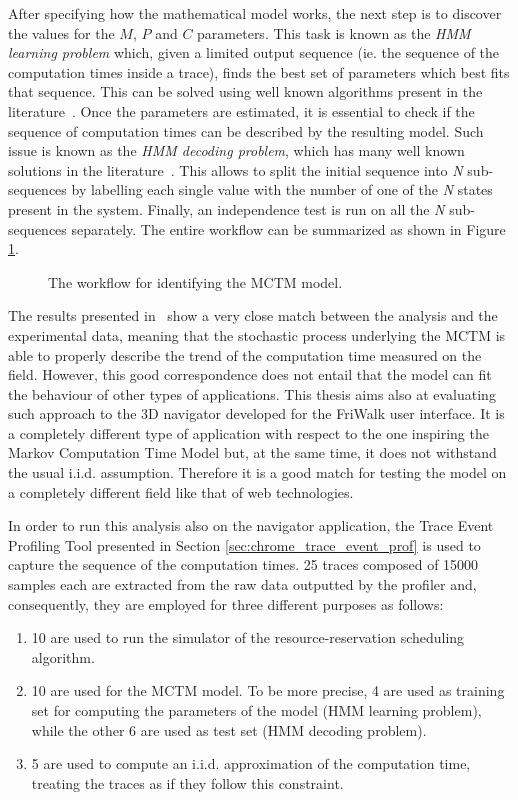 After specifying how the mathematical model works, the next step is to discover
the values for the \(M\), \(P\) and \(C\) parameters. This task is known as the
\emph{HMM learning problem} which, given a limited output sequence (ie. the
sequence of the computation times inside a trace),
finds the best set of parameters which best fits that sequence.
This can be solved using well known algorithms present in the
literature~\cite{baum1972inequality}.
Once the parameters are estimated, it is essential to check if the sequence of
computation times can be described by the resulting model.
Such issue is known as the \emph{HMM decoding problem}, which has many well
known solutions in the literature~\cite{forney1973viterbi}. This allows to split
the initial sequence into \emph{N} sub-sequences by labelling each single value
with the number of one of the \emph{N} states present in the system.
Finally, an independence test is run on all the \emph{N} sub-sequences separately.
The entire workflow can be summarized as shown in Figure \ref{img:hmm_workflow}.
\begin{figure}[!htb]
    \caption{The workflow for identifying the MCTM model.}
    \label{img:hmm_workflow}
\end{figure}

The results presented in~\cite{frias2017probabilistic} show a very close match
between the analysis and the experimental data, meaning that the stochastic
process underlying the MCTM is able to properly describe the trend of the
computation time measured on the field.
However, this good correspondence does not entail that the model can fit the
behaviour of other types of applications. This thesis aims also at evaluating such
approach to the 3D navigator developed for the FriWalk user interface.
It is a completely different type of application with respect to the one
inspiring the Markov Computation Time Model but, at the same time, it does not
withstand the usual i.i.d. assumption. Therefore it is a good match for
testing the model on a completely different field like that of web technologies.

In order to run this analysis also on the navigator application, the Trace Event
Profiling Tool presented in Section \ref{sec:chrome_trace_event_prof} is used
to capture the sequence of the computation times. 25 traces composed of 15000
samples each are extracted from the raw data outputted by the profiler and,
consequently, they are employed for three different purposes as follows:
\begin{enumerate}
    \item 10 are used to run the simulator of the resource-reservation
        scheduling algorithm.
    \item 10 are used for the MCTM model. To be more precise, 4 are used as
        training set for computing the parameters of the model (HMM learning
        problem), while the other 6 are used as test set (HMM decoding problem).
    \item 5 are used to compute an i.i.d. approximation of the computation time,
        treating the traces as if they follow this constraint.
\end{enumerate}

